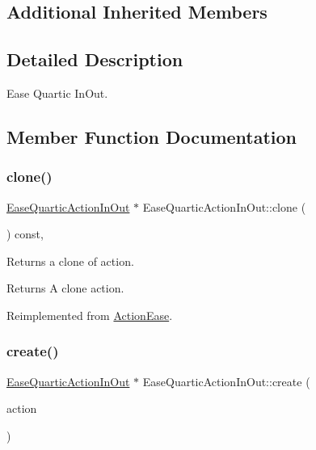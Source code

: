 \subsection*{Additional Inherited Members}


\subsection{Detailed Description}
Ease Quartic In\+Out. 

\subsection{Member Function Documentation}
\mbox{\label{classEaseQuarticActionInOut_a5f29576edb9028cb7c4461eea1030085}} 
\subsubsection{\texorpdfstring{clone()}{clone()}}
{\footnotesize\ttfamily \hyperlink{classEaseQuarticActionInOut}{Ease\+Quartic\+Action\+In\+Out} $\ast$ Ease\+Quartic\+Action\+In\+Out\+::clone (\begin{DoxyParamCaption}\item[{void}]{ }\end{DoxyParamCaption}) const\hspace{0.3cm}{\ttfamily [override]}, {\ttfamily [virtual]}}

Returns a clone of action.

\begin{DoxyReturn}{Returns}
A clone action. 
\end{DoxyReturn}


Reimplemented from \hyperlink{classActionEase_a39bec93fe161fb732a74d8e51a2fe08b}{Action\+Ease}.

\mbox{\label{classEaseQuarticActionInOut_af30609efe28ad03b11dc8e54dc297d1b}} 
\subsubsection{\texorpdfstring{create()}{create()}}
{\footnotesize\ttfamily \hyperlink{classEaseQuarticActionInOut}{Ease\+Quartic\+Action\+In\+Out} $\ast$ Ease\+Quartic\+Action\+In\+Out\+::create (\begin{DoxyParamCaption}\item[{\hyperlink{classActionInterval}{Action\+Interval} $\ast$}]{action }\end{DoxyParamCaption})\hspace{0.3cm}{\ttfamily [static]}}



